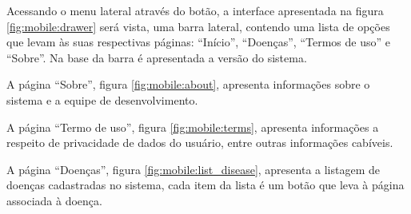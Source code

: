 Acessando o menu lateral através do botão, a interface apresentada na figura \ref{fig:mobile:drawer} será vista, uma barra lateral, contendo uma lista de opções que levam às suas respectivas páginas: ``Início'', ``Doenças'', ``Termos de uso'' e ``Sobre''. Na base da barra é apresentada a versão do sistema.

A página ``Sobre'', figura \ref{fig:mobile:about}, apresenta informações sobre o sistema e a equipe de desenvolvimento.

A página ``Termo de uso'', figura \ref{fig:mobile:terms}, apresenta informações a respeito de privacidade de dados do usuário, entre outras informações cabíveis.

A página ``Doenças'', figura \ref{fig:mobile:list_disease}, apresenta a listagem de doenças cadastradas no sistema, cada item da lista é um botão que leva à página associada à doença.


